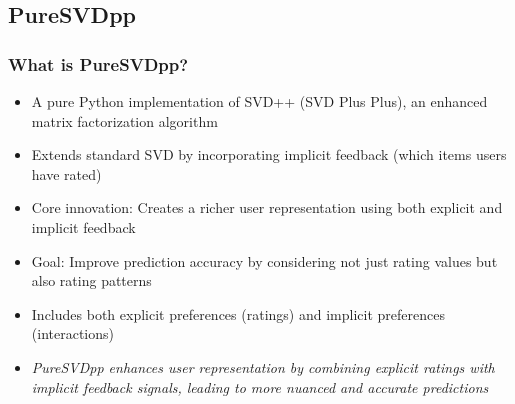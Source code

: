 \documentclass{beamer}
\begin{document}
\subsection{PureSVDpp}
\begin{frame}
\frametitle{What is PureSVDpp?}

\begin{itemize}
    \item A pure Python implementation of SVD++ (SVD Plus Plus), an enhanced matrix factorization algorithm
    \item Extends standard SVD by incorporating implicit feedback (which items users have rated)
    \item Core innovation: Creates a richer user representation using both explicit and implicit feedback
    \item Goal: Improve prediction accuracy by considering not just rating values but also rating patterns
    \item Includes both explicit preferences (ratings) and implicit preferences (interactions)

    \vspace{1cm}

    \item \textit{PureSVDpp enhances user representation by combining explicit ratings with implicit feedback signals, leading to more nuanced and accurate predictions}
\end{itemize}
\end{frame}
\end{document}
